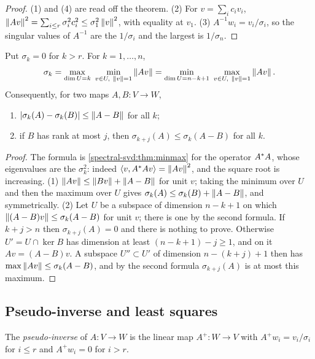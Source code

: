 \begin{notechapter}
\begin{proof}
(1) and (4) are read off the theorem. (2) For $v = \sum_ic_iv_i$,
$\left\|Av\right\|^2 = \sum_{i\leq r}\sigma_i^2c_i^2\leq\sigma_1^2\left\|v\right\|^2$, with
equality at $v_1$. (3) $A^{-1}w_i = v_i/\sigma_i$, so the singular values
of $A^{-1}$ are the $1/\sigma_i$ and the largest is $1/\sigma_n$.
\end{proof}

\begin{proposition}
\label{spectral-svd:prop:minmax-sv}
Put $\sigma_k = 0$ for $k > r$. For $k = 1,\dots,n$,
\[
  \sigma_k = \max_{\dim U = k}\ \min_{v\in U,\ \left\|v\right\| = 1}\left\|Av\right\|
  = \min_{\dim U = n - k + 1}\ \max_{v\in U,\ \left\|v\right\| = 1}\left\|Av\right\| .
\]
Consequently, for two maps $A, B:V\to W$,
\begin{enumerate}[nosep]
  \item $\left|\sigma_k(A) - \sigma_k(B)\right|\leq\left\|A - B\right\|$ for all $k$;
  \item if $B$ has rank at most $j$, then
        $\sigma_{k+j}(A)\leq\sigma_k(A - B)$ for all $k$.
\end{enumerate}
\end{proposition}

\begin{proof}
The formula is \cref{spectral-svd:thm:minmax} for the operator
$A^{*}A$, whose eigenvalues are the $\sigma_k^2$: indeed
$\left\langle v, A^{*}Av \right\rangle = \left\|Av\right\|^2$, and the square root is increasing.
(1) $\left\|Av\right\|\leq\left\|Bv\right\| + \left\|A - B\right\|$ for unit $v$; taking the
minimum over $U$ and then the maximum over $U$ gives
$\sigma_k(A)\leq\sigma_k(B) + \left\|A - B\right\|$, and symmetrically. (2) Let
$U$ be a subspace of dimension $n - k + 1$ on which
$\left\|(A - B)v\right\|\leq\sigma_k(A - B)$ for unit $v$; there is one by the
second formula. If $k + j > n$ then $\sigma_{k+j}(A) = 0$ and there is
nothing to prove. Otherwise $U' = U\cap\ker B$ has dimension at least
$(n - k + 1) - j\geq1$, and on it $Av = (A - B)v$. A subspace
$U''\subset U'$ of dimension $n - (k + j) + 1$ then has
$\max\left\|Av\right\|\leq\sigma_k(A - B)$, and by the second formula
$\sigma_{k+j}(A)$ is at most this maximum.
\end{proof}

\subsection{Pseudo-inverse and least squares}

\begin{definition}\label{spectral-svd:def:pinv}
The \emph{pseudo-inverse} of $A:V\to W$ is the linear map $A^+:W\to V$
with $A^+w_i = v_i/\sigma_i$ for $i\leq r$ and $A^+w_i = 0$ for $i > r$.
\end{definition}


\end{notechapter}
